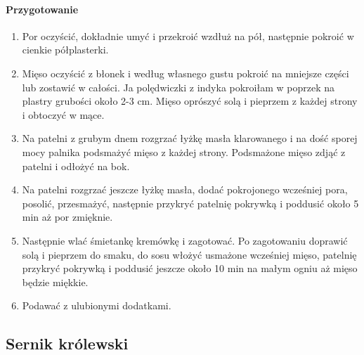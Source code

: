 \documentclass{article}
\begin{document}
    \paragraph{Przygotowanie}
    \begin{enumerate}
        \item Por oczyścić, dokładnie umyć i przekroić wzdłuż na pół, następnie
            pokroić w cienkie półplasterki.
        \item Mięso oczyścić z błonek i według własnego gustu pokroić na
            mniejsze części lub zostawić w całości. Ja polędwiczki z indyka
            pokroiłam w poprzek na plastry grubości około 2-3 cm. Mięso oprószyć
            solą i pieprzem z każdej strony i obtoczyć w mące.
        \item Na patelni z grubym dnem rozgrzać łyżkę masła klarowanego i na
            dość sporej mocy palnika podsmażyć mięso z każdej strony.
            Podsmażone mięso zdjąć z patelni i odłożyć na bok.
        \item Na patelni rozgrzać jeszcze łyżkę masła, dodać pokrojonego
            wcześniej pora, posolić, przesmażyć, następnie przykryć patelnię
            pokrywką i poddusić około 5 min aż por zmięknie.
        \item Następnie wlać śmietankę kremówkę i zagotować. Po zagotowaniu
            doprawić solą i pieprzem do smaku, do sosu włożyć usmażone wcześniej
            mięso, patelnię przykryć pokrywką i poddusić jeszcze około 10 min na
            małym ogniu aż mięso będzie miękkie.
        \item Podawać z ulubionymi dodatkami.
    \end{enumerate}
    \newpage

    \subsection{Sernik królewski}
    \bigskip
\end{document}
